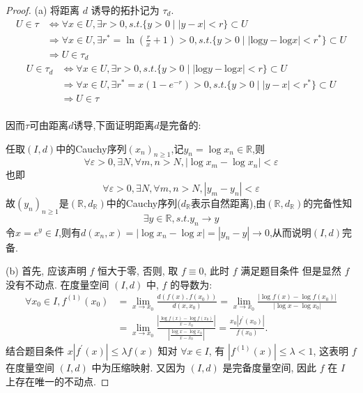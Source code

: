\begin{proof}
    (a) 将距离 $d$ 诱导的拓扑记为 $\tau _d$.
    \[\begin{split}U\in\tau&\Leftrightarrow\forall x\in U,\exists r>0,s.t.\{y>0\mid|y-x|<r\}\subset U\\&\Rightarrow\forall x\in U,\exists r^{*}=\ln\left(\frac{r}{x}+1\right)>0,s.t.\{y>0\mid|\textrm{log}y-\textrm{log}x|<r^{*}\}\subset U\\&\Rightarrow U\in\tau _d\end{split}\]
    \[\begin{split}U\in\tau_d&\Leftrightarrow\forall x\in U,\exists r>0,s.t.\{y>0\mid|\textrm{log}y-\textrm{log}x|<r\}\subset U\\&\Rightarrow\forall x\in U,\exists r^{*}=x(1-e^{-r})>0,s.t.\{y>0\mid|y-x|<r^{*}\}\subset U\\&\Rightarrow U\in\tau\end{split}\]\\
    因而$\tau$可由距离$d$诱导,下面证明距离$d$是完备的:

    任取$(I,d)$中的Cauchy序列$(x_n)_{n\geq 1}$,记$y_n=\log x_n\in\mathbb{R}$,则
    \[\forall\varepsilon >0,\exists N,\forall m,n>N,|\log x_m-\log x_n|<\varepsilon\]
    也即
    \[\forall\varepsilon >0,\exists N,\forall m,n>N,|y_m-y_n|<\varepsilon\]
    故$(y_n)_{n\geq 1}$是$(\mathbb{R},d_{\mathbb{R}})$中的Cauchy序列($d_{\mathbb{R}}$表示自然距离),由$(\mathbb{R},d_{\mathbb{R}})$的完备性知\[\exists y\in\mathbb{R},s.t.y_n\rightarrow y\]
    令$x=e^y\in I$,则有$d(x_n,x)=|\log x_n-\log x|=|y_n-y|\rightarrow 0$,从而说明$(I,d)$完备.

    (b) 首先, 应该声明 $f$ 恒大于零, 否则, 取 $f\equiv 0$, 此时 $f$ 满足题目条件
    但是显然 $f$ 没有不动点.
    在度量空间 $(I,d)$ 中, $f$ 的导数为:
    \begin{align*}
        \forall x_0\in I,f^{(1)}(x_0)
        & =\lim_{x\to x_0}\frac{d(f(x),f(x_0))}{d(x,x_0)}=\lim_{x\to x_0}\frac{|\log f(x)-\log f(x_0)|}{|\log x-\log x_0|}\\
        & =\lim_{x\to x_0}\frac{\left|\frac{\log f(x)-\log f(x_0)}{x-x_0}\right|}{\left|\frac{\log x-\log x_0}{x-x_0}\right|}=\frac{x_0|f^{\prime}(x_0)|}{f(x_0)}.
    \end{align*}
    结合题目条件 $x|f^{\prime}(x)|\leq\lambda f(x)$
    知对 $\forall x\in I$, 有 $|f^{(1)}(x)|\leq\lambda<1$, 
    这表明 $f$ 在度量空间 $(I,d)$ 中为压缩映射.
    又因为 $(I,d)$ 是完备度量空间, 因此 $f$ 在 $I$ 上存在唯一的不动点.
\end{proof}



